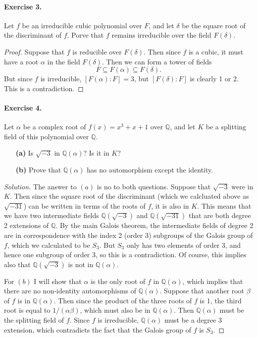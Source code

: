 \documentclass{article}
\newcommand{\Q}{\mathbb Q}
\begin{document}
\paragraph{Exercise 3.} Let $f$ be an irreducible cubic polynomial over $F$, and let $\delta$ be the square root of the discriminant of $f$. Porve that $f$ remains irreducible over the field $F(\delta)$. 

\begin{proof}
Suppose that $f$ is reducible over $F(\delta)$. Then since $f$ is a cubic, it must have a root $\alpha$ in the field $F(\delta)$. Then we can form a tower of fields
$$F\subseteq F(\alpha) \subseteq F(\delta).$$
But since $f$ is irreducible, $[F(\alpha):F]=3$, but $[F(\delta):F]$ is clearly 1 or 2. This is a contradiction. 
\end{proof}

\paragraph{Exercise 4.} Let $\alpha$ be a complex root of $f(x)=x^3+x+1$ over $\Q$, and let $K$ be a splitting field of this polynomial over $\Q$. 
\begin{itemize}
\item[\bf(a)] Is $\sqrt{-3}$ in $\Q(\alpha)$? Is it in $K$?
\item[\bf(b)] Prove that $\Q(\alpha)$ has no automorphism except the identity.
\end{itemize}

\begin{proof}[Solution]
The answer to $(a)$ is no to both questions. Suppose that $\sqrt{-3}$ were in $K$. Then since the square root of the discriminant (which we calcluated above as $\sqrt{-31}$) can be written in terms of the roots of $f$, it is also in $K$. This means that we have two intermediate fields $\Q(\sqrt{-3})$ and $\Q(\sqrt{-31})$ that are both degree 2 extensions of $\Q$. By the main Galois theorem, the intermediate fields of degree 2 are in correspondence with the index 2 (order 3) subgroups of the Galois group of $f$, which we calculated to be $S_3$. But $S_3$ only has two elements of order 3, and hence one subgroup of order 3, so this is a contradiction. Of course, this implies also that $\Q(\sqrt{-3})$ is not in $\Q(\alpha)$. 

For $(b)$ I will show that $\alpha$ is the only root of $f$ in $\Q(\alpha)$, which implies that there are no non-identity automorphisms of $\Q(\alpha)$. Suppose that another root $\beta$ of $f$ is in $\Q(\alpha)$. Then since the product of the three roots of $f$ is 1, the third root is equal to $1/(\alpha\beta)$, which must also be in $\Q(\alpha)$. Then $\Q(\alpha)$ must be the splitting field of $f$. Since $f$ is irreducible, $\Q(\alpha)$ must be a degree 3 extension, which contradicts the fact that the Galois group of $f$ is $S_3$. 
\end{proof}
\end{document}
